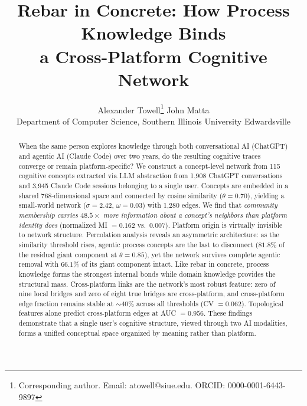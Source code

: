 \documentclass[11pt,twocolumn]{article}
\begin{document}
\title{Rebar in Concrete: How Process Knowledge Binds\\a Cross-Platform Cognitive Network}

\author{
  Alexander Towell\thanks{Corresponding author. Email: atowell@siue.edu. ORCID: 0000-0001-6443-9897}
  \quad
  John Matta \\
  \small Department of Computer Science,
  Southern Illinois University Edwardsville
}

\date{}

\maketitle

\begin{abstract}
When the same person explores knowledge through both conversational AI (ChatGPT) and agentic AI (Claude Code) over two years, do the resulting cognitive traces converge or remain platform-specific?
We construct a concept-level network from 115 cognitive concepts extracted via LLM abstraction from 1,908 ChatGPT conversations and 3,945 Claude Code sessions belonging to a single user.
Concepts are embedded in a shared 768-dimensional space and connected by cosine similarity ($\theta = 0.70$), yielding a small-world network ($\sigma = 2.42$, $\omega = 0.03$) with 1,280 edges.
We find that \emph{community membership carries $48.5\times$ more information about a concept's neighbors than platform identity does} (normalized MI $= 0.162$ vs.\ $0.007$).
Platform origin is virtually invisible to network structure.
Percolation analysis reveals an asymmetric architecture: as the similarity threshold rises, agentic process concepts are the last to disconnect ($81.8\%$ of the residual giant component at $\theta = 0.85$), yet the network survives complete agentic removal with $66.1\%$ of its giant component intact.
Like rebar in concrete, process knowledge forms the strongest internal bonds while domain knowledge provides the structural mass.
Cross-platform links are the network's most robust feature: zero of nine local bridges and zero of eight true bridges are cross-platform, and cross-platform edge fraction remains stable at $\sim$$40\%$ across all thresholds (CV $= 0.062$).
Topological features alone predict cross-platform edges at AUC $= 0.956$.
These findings demonstrate that a single user's cognitive structure, viewed through two AI modalities, forms a unified conceptual space organized by meaning rather than platform.
\end{abstract}
\end{document}
